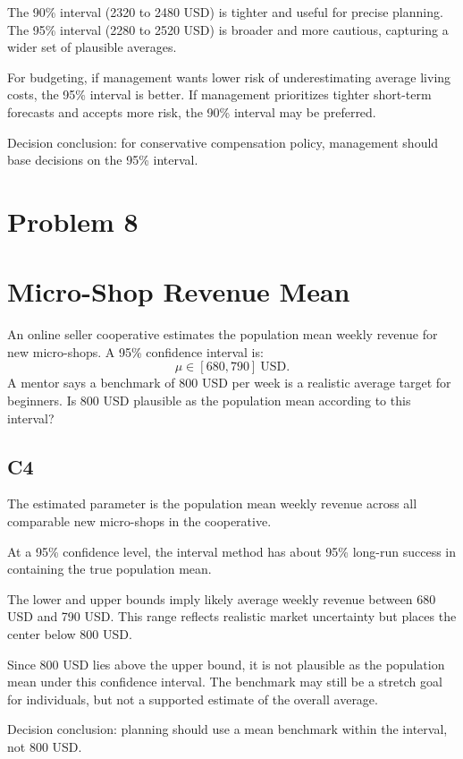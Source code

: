 \begin{ExamProblems}
		The 90\% interval (2320 to 2480 USD) is tighter and useful for precise planning.
		The 95\% interval (2280 to 2520 USD) is broader and more cautious, capturing a wider set of plausible averages.

		For budgeting, if management wants lower risk of underestimating average living costs, the 95\% interval is better.
		If management prioritizes tighter short-term forecasts and accepts more risk, the 90\% interval may be preferred.

		Decision conclusion: for conservative compensation policy, management should base decisions on the 95\% interval.

		\newpage
		\item
		\section{Problem 8}
		\section{Micro-Shop Revenue Mean}
		An online seller cooperative estimates the population mean weekly revenue for new micro-shops.
		A 95\% confidence interval is:
		\[
		\mu \in [680, 790]\ \text{USD}.
		\]
		A mentor says a benchmark of 800 USD per week is a realistic average target for beginners.
		Is 800 USD plausible as the population mean according to this interval?

		\subsection*{C4}
		The estimated parameter is the population mean weekly revenue across all comparable new micro-shops in the cooperative.

		At a 95\% confidence level, the interval method has about 95\% long-run success in containing the true population mean.

		The lower and upper bounds imply likely average weekly revenue between 680 USD and 790 USD.
		This range reflects realistic market uncertainty but places the center below 800 USD.

		Since 800 USD lies above the upper bound, it is not plausible as the population mean under this confidence interval.
		The benchmark may still be a stretch goal for individuals, but not a supported estimate of the overall average.

		Decision conclusion: planning should use a mean benchmark within the interval, not 800 USD.


\end{ExamProblems}
